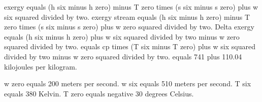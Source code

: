 exergy equals (h six minus h zero) minus T zero times (s six minus s zero) plus w six squared divided by two.  
exergy stream equals (h six minus h zero) minus T zero times (s six minus s zero) plus w zero squared divided by two.  
Delta exergy equals (h six minus h zero) plus w six squared divided by two minus w zero squared divided by two.  
equals cp times (T six minus T zero) plus w six squared divided by two minus w zero squared divided by two.  
equals 741 plus 110.04 kilojoules per kilogram.  

w zero equals 200 meters per second.  
w six equals 510 meters per second.  
T six equals 380 Kelvin.  
T zero equals negative 30 degrees Celsius.